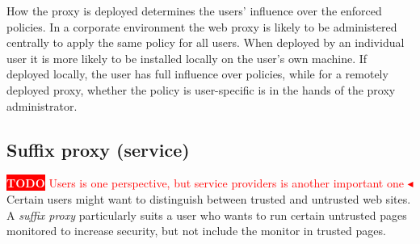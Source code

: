 \documentclass{llncs}
\newcommand{\todo}[1]{\colorbox{red}{\textcolor{white}{\sffamily\bfseries\scriptsize TODO}} \textcolor{red}{#1} \textcolor{red}{$\blacktriangleleft$}}
\begin{document}
How the proxy is 
deployed determines the users' influence over 
the enforced policies.
In a corporate environment the web proxy is likely to be 
administered centrally to apply the same policy for all users. When deployed by 
an individual user it is more likely to be installed locally on the user's own machine.
If deployed locally, the user has full influence over 
policies, while for a remotely deployed proxy,
whether the policy is user-specific is 
in the hands of the proxy administrator. 






\subsection{Suffix proxy (service)}
\label{sec:arch-suffix}
\todo{Users is one perspective, but  service providers is another
  important one}
Certain users might want to distinguish between trusted and untrusted web sites.
A \emph{suffix proxy} particularly suits a user who wants to run certain untrusted 
pages monitored to increase security, but not include the monitor in trusted pages.
\end{document}
